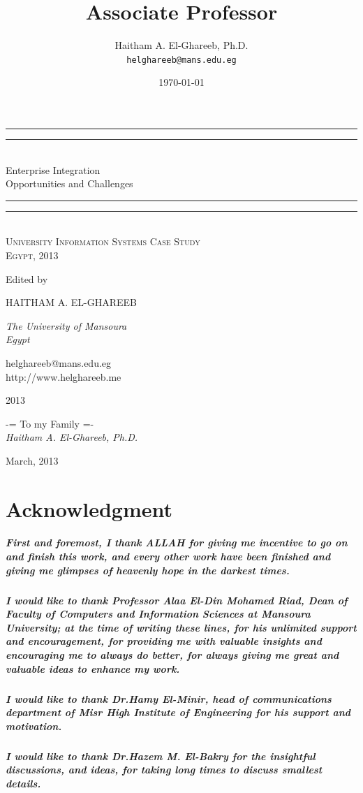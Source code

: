 \documentclass[12pt,a4paper,final,twoside,onecolumn,titlepage]{book}
\author{Haitham A. El-Ghareeb, Ph.D. \\ \texttt{helghareeb@mans.edu.eg}}
\title{Associate Professor}
\date{\today}
\makeatletter
\newcommand*{\plogo}{\fbox{$\mathcal{PL}$}} %
\newcommand*{\titleGP}{\begingroup %
\centering %
\vspace*{\baselineskip} %

\rule{\textwidth}{1.6pt}\vspace*{-\baselineskip}\vspace*{2pt} %
\rule{\textwidth}{0.4pt}\\[\baselineskip] %

{\LARGE Enterprise Integration \\ Opportunities and Challenges}\\[0.2\baselineskip] %

\rule{\textwidth}{0.4pt}\vspace*{-\baselineskip}\vspace{3.2pt} %
\rule{\textwidth}{1.6pt}\\[\baselineskip] %

\scshape %
University Information Systems Case Study \\[\baselineskip] %
Egypt,  2013\par %

\vspace*{2\baselineskip} %

Edited by \\[\baselineskip]
{\Large HAITHAM A. EL-GHAREEB \par} %
{\itshape The University of Mansoura \\ Egypt\par} %

\vfill %

{\large helghareeb@mans.edu.eg \\ http://www.helghareeb.me}\par %
{\scshape 2013} \\[0.3\baselineskip] %

\endgroup}
\makeatother
\begin{document}
\frontmatter


\thispagestyle{empty}
\titleGP %


\cleardoublepage
\thispagestyle{empty}
\begin{center}
-= To my Family =- \\
\textit{Haitham A. El-Ghareeb, Ph.D.}
\end{center}

\begin{flushright}
March, 2013
\end{flushright}

\cleardoublepage
{}
\chapter{Acknowledgment}
\thispagestyle{empty}
\paragraph*{
First and foremost, I thank ALLAH for giving me incentive to go on and finish this work, and every other work have been finished and giving me glimpses of heavenly hope in the darkest times.}
\paragraph*{I would like to thank Professor Alaa El-Din Mohamed Riad, Dean of Faculty of Computers and Information Sciences at Mansoura University; at the time of writing these lines, for his unlimited support and encouragement, for providing me with valuable insights and encouraging me to always do better, for always giving me great and valuable ideas to enhance my work.}
\paragraph*{I would like to thank Dr.Hamy El-Minir, head of communications department of Misr High Institute of Engineering for his support and motivation.}

\paragraph*{I would like to thank Dr.Hazem M. El-Bakry for the insightful discussions, and ideas, for taking long times to discuss smallest details.}
\end{document}
